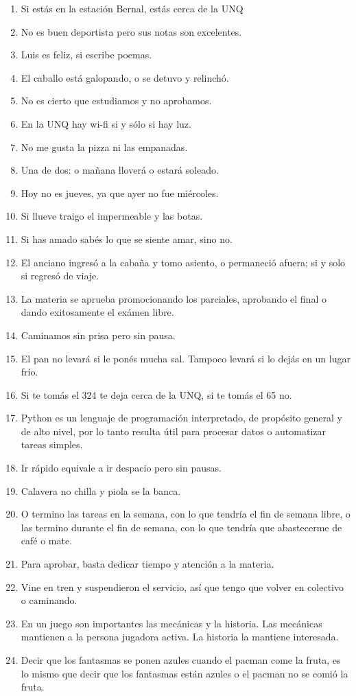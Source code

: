 \documentclass[a4paper]{article}
\newcommand{\Item}{\item[\stepcounter{enumii}$\blacktriangleright$\textbf{(\alph{enumii})}]} %
\begin{document}
\begin{enumerate}
\begin{multicols}{2}
\begin{enumerate} [label=(\alph*)]
		\item Si estás en la estación Bernal, estás cerca de la UNQ 
		\Item No es buen deportista pero sus notas son excelentes.
		\item Luis es feliz, si escribe poemas.
		\Item El caballo está galopando, o se detuvo y relinchó.
		\item No es cierto que estudiamos y no aprobamos.
		\item En la UNQ hay wi-fi si y sólo si hay luz.
		\Item No me gusta la pizza ni las empanadas. 
		\item Una de dos: o mañana lloverá o estará soleado. 
		\item Hoy no es jueves, ya que ayer no fue miércoles.
		\item Si llueve traigo el impermeable y las botas. 
		\item Si has amado sabés lo que se siente amar, sino no. 
		\Item El anciano ingresó a la cabaña y tomo asiento, o permaneció afuera; si y solo si regresó de viaje.
		\item La materia se aprueba promocionando los parciales, aprobando el final o dando exitosamente el exámen libre. 
		\item Caminamos sin prisa pero sin pausa. 
		\Item El pan no levará si le ponés mucha sal. Tampoco levará si lo dejás en un lugar frío. 
		\item Si te tomás el 324 te deja cerca de la UNQ, si te tomás el 65 no. 
		\Item Python es un lenguaje de programación interpretado, de propósito general y de alto nivel, por lo tanto resulta útil para procesar datos o automatizar tareas simples. 
		\item Ir rápido equivale a ir despacio pero sin pausas. 
		\item Calavera no chilla y piola se la banca.
		\Item O termino las tareas en la semana, con lo que tendría el fin de semana libre, o las termino durante el fin de semana, con lo que tendría que abastecerme de café o mate.  
		\item Para aprobar, basta dedicar tiempo y atención a la materia.  
		\Item Vine en tren y suspendieron el servicio, así que tengo que volver en colectivo o caminando.
		\item En un juego son importantes las mecánicas y la historia. Las mecánicas mantienen a la persona jugadora activa. La historia la mantiene interesada. 
		\Item Decir que los fantasmas se ponen azules cuando el pacman come la fruta, es lo mismo que decir que los fantasmas están azules o el pacman no se comió la fruta. 
	\end{enumerate}

\end{multicols}
\end{enumerate}
\end{document}
